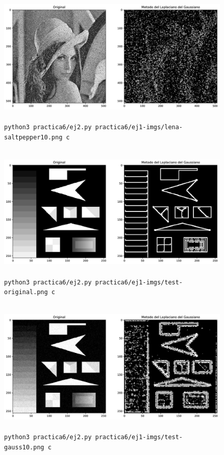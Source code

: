 \documentclass[11pt, spanish]{article}
\begin{document}
\begin{figure}[H]
\centering
    \includegraphics[height=6.5cm]{informe-imgs/ej2-c-lena-saltpepper10.jpg}
    \caption{\texttt{python3 practica6/ej2.py practica6/ej1-imgs/lena-saltpepper10.png c}}
\end{figure}


\begin{figure}[H]
\centering
    \includegraphics[height=6.5cm]{informe-imgs/ej2-c-test-original.jpg}
    \caption{\texttt{python3 practica6/ej2.py practica6/ej1-imgs/test-original.png c}}
\end{figure}

\begin{figure}[H]
\centering
    \includegraphics[height=6.5cm]{informe-imgs/ej2-c-test-gauss10.jpg}
    \caption{\texttt{python3 practica6/ej2.py practica6/ej1-imgs/test-gauss10.png c}}
\end{figure}
\end{document}
